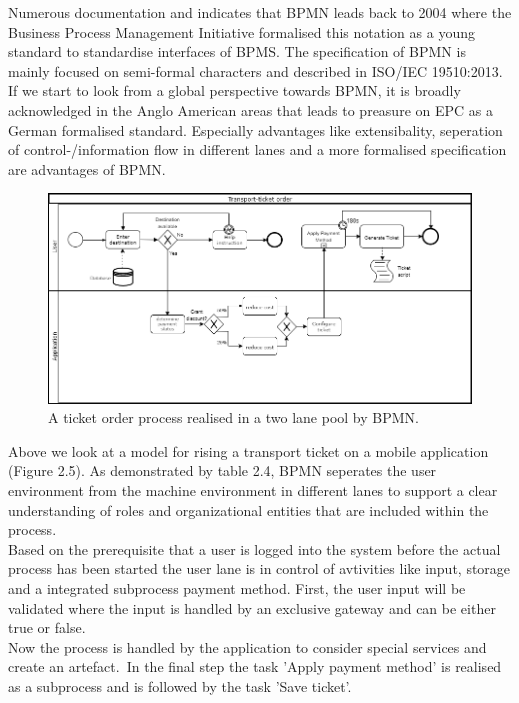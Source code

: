 \newpage
Numerous documentation \cite{DirkStahler.} and \cite{GeroDecker.} indicates that BPMN leads back to 2004 where the Business Process Management Initiative formalised this notation as a young standard to standardise interfaces of BPMS. The specification of BPMN is mainly focused on semi-formal characters and described in ISO/IEC 19510:2013. If we start to look from a global perspective towards BPMN, it is broadly acknowledged in the Anglo American areas that leads to preasure on EPC as a German formalised standard. Especially advantages like extensibality, seperation of control-/information flow in different lanes and a more formalised specification are advantages of BPMN.\\


\begin{figure}[!hb]
	\centering
	\includegraphics[scale=0.55]{BPMN_Ticket_Order}
	\caption{A ticket order process realised in a two lane pool by BPMN.}
\end{figure}

Above we look at a model for rising a transport ticket on a mobile application (Figure 2.5). As demonstrated by table 2.4, BPMN seperates the user environment from the machine environment in different lanes to support a clear understanding of roles and organizational entities that are included within the process. \\
Based on the prerequisite that a user is logged into the system before the actual process has been started the user lane is in control of avtivities like input, storage and a integrated subprocess payment method. First, the user input will be validated where the input is handled by an exclusive gateway and can be either true or false.\\
Now the process is handled by the application to consider special services and create an artefact.\
In the final step the task 'Apply payment method' is realised as a subprocess and is followed by the task 'Save ticket'.


